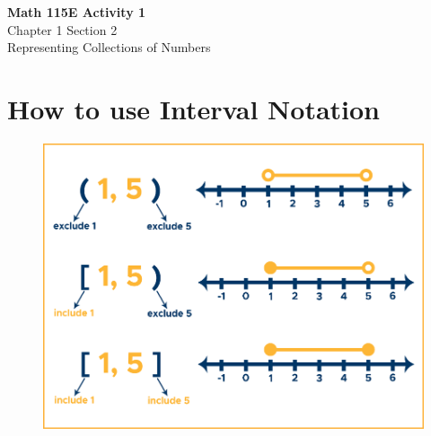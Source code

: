 \documentclass{article}
\begin{document}
\begin{center}
    \Large \textbf{Math 115E Activity 1} \\
    \vspace{0.2cm}
    \normalsize Chapter 1 Section 2 \\
    \normalsize Representing Collections of Numbers
\end{center}
\vspace{1cm} %

\section*{How to use Interval Notation}

\begin{figure}[h!]
    \begin{minipage}{0.48\textwidth}
        \centering
        \includegraphics[scale=0.75]{Interval_chart.png}
        \label{fig:image1}
    \end{minipage}
    \hfill
    \begin{minipage}{0.48\textwidth}
        \centering

\end{minipage}
\end{figure}
\end{document}
